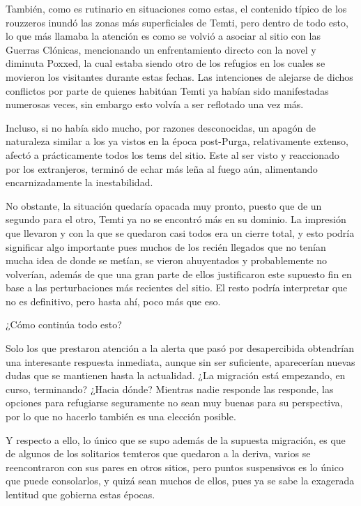 \documentclass[
  spanish,
]{book}
\begin{document}
También, como es rutinario en situaciones como estas, el contenido típico de los rouzzeros inundó las zonas más superficiales de Temti, pero dentro de todo esto, lo que más llamaba la atención es como se volvió a asociar al sitio con las Guerras Clónicas, mencionando un enfrentamiento directo con la novel y diminuta Poxxed, la cual estaba siendo otro de los refugios en los cuales se movieron los visitantes durante estas fechas. Las intenciones de alejarse de dichos conflictos por parte de quienes habitúan Temti ya habían sido manifestadas numerosas veces, sin embargo esto volvía a ser reflotado una vez más.

Incluso, si no había sido mucho, por razones desconocidas, un apagón de naturaleza similar a los ya vistos en la época post-Purga, relativamente extenso, afectó a prácticamente todos los tems del sitio. Este al ser visto y reaccionado por los extranjeros, terminó de echar más leña al fuego aún, alimentando encarnizadamente la inestabilidad.

No obstante, la situación quedaría opacada muy pronto, puesto que de un segundo para el otro, Temti ya no se encontró más en su dominio. La impresión que llevaron y con la que se quedaron casi todos era un cierre total, y esto podría significar algo importante pues muchos de los recién llegados que no tenían mucha idea de donde se metían, se vieron ahuyentados y probablemente no volverían, además de que una gran parte de ellos justificaron este supuesto fin en base a las perturbaciones más recientes del sitio. El resto podría interpretar que no es definitivo, pero hasta ahí, poco más que eso.

¿Cómo continúa todo esto?

Solo los que prestaron atención a la alerta que pasó por desapercibida obtendrían una interesante respuesta inmediata, aunque sin ser suficiente, aparecerían nuevas dudas que se mantienen hasta la actualidad. ¿La migración está empezando, en curso, terminando? ¿Hacia dónde? Mientras nadie responde las responde, las opciones para refugiarse seguramente no sean muy buenas para su perspectiva, por lo que no hacerlo también es una elección posible.

Y respecto a ello, lo único que se supo además de la supuesta migración, es que de algunos de los solitarios temteros que quedaron a la deriva, varios se reencontraron con sus pares en otros sitios, pero puntos suspensivos es lo único que puede consolarlos, y quizá sean muchos de ellos, pues ya se sabe la exagerada lentitud que gobierna estas épocas.
\end{document}

